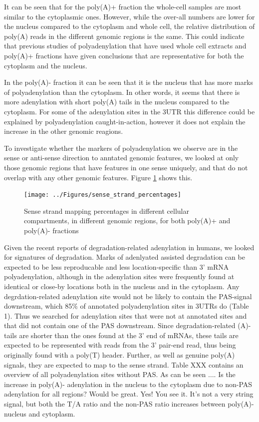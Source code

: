 \documentclass[a4paper]{article}
\begin{document}
It can be seen that for the poly(A)+ fraction the whole-cell samples are most
similar to the cytoplasmic ones. However, while the over-all numbers are lower for
the nucleus compared to the cytoplasm and whole cell, the relative distribution of
poly(A) reads in the different genomic regions is the same. This could indicate that
previous studies of polyadenylation that have used whole cell extracts and
poly(A)+ fractions have given conclusions that are representative for both the
cytoplasm and the nucleus.

In the poly(A)- fraction it can be seen that it is the nucleus that has more
marks of polyadenylation than the cytoplasm. In other words, it seems that
there is more adenylation with short poly(A) tails in the nucleus compared to
the cytoplasm. For some of the adenylation sites in the 3UTR this difference
could be explained by polyadenylation caught-in-action, however it does not
explain the increase in the other genomic reagions.

To investigate whether the markers of polyadenylation we observe are in the
sense or anti-sense direction to anntated genomic features, we looked at only
those genomic regions that have features in one sense uniquely, and that do not
overlap with any other genomic features. Figure \ref{fig:sense} shows this.
\begin{figure}[h]
	\centering
		\texttt{[image: ../Figures/sense\_strand\_percentages]}
	\caption{Sense strand mapping percentages in different cellular compartments, in
	different genomic regions, for both poly(A)+ and poly(A)- fractions}
	\label{fig:sense}
\end{figure}

Given the recent reports of degradation-related adenylation in humans, we
looked for signatures of degradation. Marks of adenlyated assisted degradation
can be expected to be less reproducable and less location-specific than 3' mRNA
polyadenylation, although in \cite{} the adenylation sites were frequently
found at identical or close-by locations both in the nucleus and in the
cytoplasm. Any degrdation-related adenylation site would not be likely to
contain the PAS-signal downstream, which 85\% of annotated polyadenylation
sites in 3UTRs do (Table 1). Thus we searched for adenylation sites that were
not at annotated sites and that did not contain one of the PAS downstream.
Since degradation-related (A)-tails are shorter than the ones found at the 3'
end of mRNAs, these tails are expected to be represented with reads from the 3'
pair-end read, thus being originally found with a poly(T) header. Further, as
well as genuine poly(A) signals, they are expected to map to the sense strand.
Table XXX contains an overview of all polyadenylation sites without PAS. As can
be seen $\dots$. Is the increase in poly(A)- adenylation in the nucleus to the
cytoplasm due to non-PAS adenylation for all regions? Would be great. Yes! You
see it. It's not a very string signal, but both the T/A ratio and the non-PAS
ratio increases between poly(A)- nucleus and cytoplasm.
\end{document}
